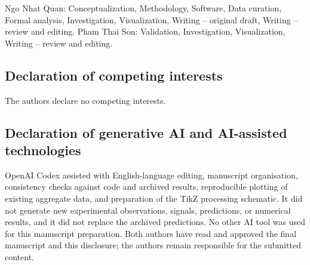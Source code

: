 \documentclass[11pt,a4paper]{article}
\begin{document}
Ngo Nhat Quan: Conceptualization, Methodology, Software, Data curation, Formal analysis,
Investigation, Visualization, Writing -- original draft, Writing -- review and editing. Pham Thai Son:
Validation, Investigation, Visualization, Writing -- review and editing.

\subsection*{Declaration of competing interests}

The authors declare no competing interests.

\subsection*{Declaration of generative AI and AI-assisted technologies}

OpenAI Codex assisted with English-language editing, manuscript organisation, consistency checks
against code and archived results, reproducible plotting of existing aggregate data, and preparation of
the TikZ processing schematic. It did not generate new experimental observations, signals, predictions,
or numerical results, and it did not replace the archived predictions. No other AI tool was used for this
manuscript preparation. Both authors have read and approved the final manuscript and this disclosure; the
authors remain responsible for the submitted content.

\begingroup
\small


\endgroup
\end{document}

